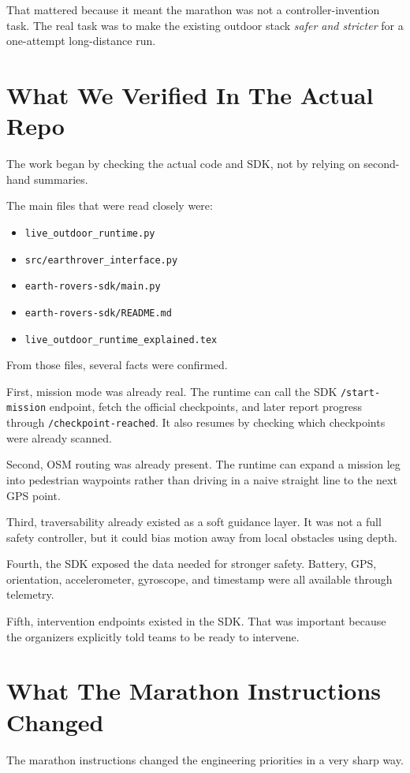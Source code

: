 \documentclass[11pt]{article}
\begin{document}
That mattered because it meant the marathon was not a controller-invention task. The real task was to make the existing outdoor stack \emph{safer and stricter} for a one-attempt long-distance run.

\section{What We Verified In The Actual Repo}
The work began by checking the actual code and SDK, not by relying on second-hand summaries.

The main files that were read closely were:
\begin{itemize}[leftmargin=*]
\item \texttt{live\_outdoor\_runtime.py}
\item \texttt{src/earthrover\_interface.py}
\item \texttt{earth-rovers-sdk/main.py}
\item \texttt{earth-rovers-sdk/README.md}
\item \texttt{live\_outdoor\_runtime\_explained.tex}
\end{itemize}

From those files, several facts were confirmed.

First, mission mode was already real. The runtime can call the SDK \texttt{/start-mission} endpoint, fetch the official checkpoints, and later report progress through \texttt{/checkpoint-reached}. It also resumes by checking which checkpoints were already scanned.

Second, OSM routing was already present. The runtime can expand a mission leg into pedestrian waypoints rather than driving in a naive straight line to the next GPS point.

Third, traversability already existed as a soft guidance layer. It was not a full safety controller, but it could bias motion away from local obstacles using depth.

Fourth, the SDK exposed the data needed for stronger safety. Battery, GPS, orientation, accelerometer, gyroscope, and timestamp were all available through telemetry.

Fifth, intervention endpoints existed in the SDK. That was important because the organizers explicitly told teams to be ready to intervene.

\section{What The Marathon Instructions Changed}
The marathon instructions changed the engineering priorities in a very sharp way.
\end{document}
